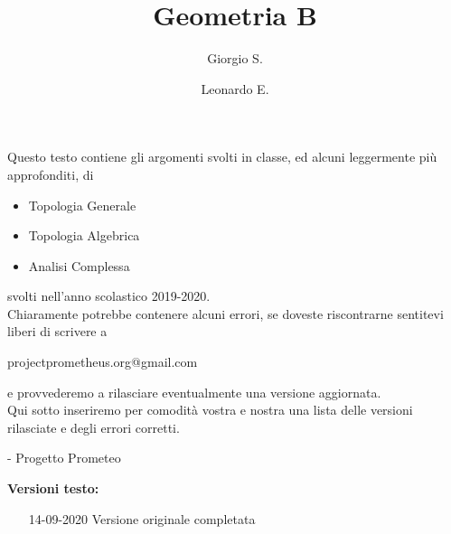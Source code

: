 \documentclass[a4paper, twoside]{book}
\begin{document}

\setcounter{page}{1} %


\title{Geometria B}
\author{Giorgio S. \and Leonardo E.}
\maketitle


\frontmatter


\setcounter{page}{1}

\tableofcontents





\mainmatter		%


Questo testo contiene gli argomenti svolti in classe, ed alcuni leggermente più approfonditi, di
\begin{itemize}
	\item Topologia Generale
	\item Topologia Algebrica
	\item Analisi Complessa
\end{itemize}
svolti nell'anno scolastico 2019-2020. \\ Chiaramente potrebbe contenere alcuni errori, se doveste riscontrarne sentitevi liberi di scrivere a 

	\begin{verbatim*}
	projectprometheus.org@gmail.com
	\end{verbatim*}

e provvederemo a rilasciare eventualmente una versione aggiornata. \\ Qui sotto inseriremo per comodità vostra e nostra una lista delle versioni rilasciate e degli errori corretti.
\begin{flushright}
	- Progetto Prometeo
\end{flushright}
\newpage
\begin{flushleft}
	\textbf{{\Large Versioni testo:}}
\end{flushleft}
\begin{itemize}
	\item[14-09-2020] Versione originale completata
\end{itemize}
\end{document}
